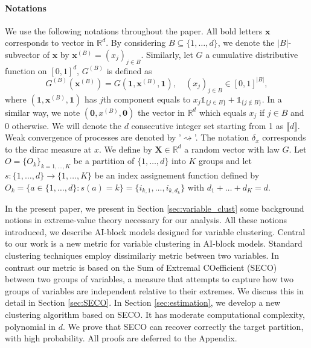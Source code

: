 \documentclass[11pt]{article}
\begin{document}
	\paragraph{Notations} We use the following notations throughout the paper. All bold letters $\textbf{x}$ corresponds to vector in $\mathbb{R}^d$. By considering $B \subseteq \{1,\dots,d\}$, we denote the $|B|$-subvector of $\textbf{x}$ by $\textbf{x}^{(B)} = (x_j)_{j \in B}$. Similarly, let $G$ a cumulative distributive function on $[0,1]^d$, $G^{(B)}$ is defined as
	\begin{equation*}
		G^{(B)}(\textbf{x}^{(B)}) = G(\textbf{1},\textbf{x}^{(B)}, \textbf{1}), \quad (x_j)_{j \in B} \in [0,1]^{|B|},
	\end{equation*}
	where $(\textbf{1},\textbf{x}^{(B)}, \textbf{1})$ has $j$th component equals to $x_j \mathds{1}_{\{j \in B\}} + \mathds{1}_{\{ j \notin B\}}$. In a similar way, we note $(\textbf{0}, x^{(B)}, \textbf{0})$ the vector in $\mathbb{R}^d$ which equals $x_j$ if $j \in B$ and $ 0 $ otherwise. We will denote the $d$ consecutive integer set starting from 1 as $\llbracket d \rrbracket$. Weak convergence of processes are denoted by '$\rightsquigarrow$'. The notation $\delta_x$ corresponds to the dirac measure at $x$. We define by $\textbf{X} \in \mathbb{R}^d$ a random vector with law $G$. Let $O = \{O_k\}_{k= 1 ,\dots, K}$ be a partition of $\{1,\dots,d\}$ into $K$ groups and let $s : \{1,\dots,d\} \rightarrow \{1,\dots,K\}$ be an index assignement function defined by $O_k = \{a \in \{1,\dots,d\} : s(a) = k\} = \{i_{k,1}, \dots, i_{k,d_k}\}$ with $d_1+\dots+d_K = d$.
	
	In the present paper, we present in Section \ref{sec:variable_clust} some background notions in extreme-value theory necessary for our analysis. All these notions introduced, we describe AI-block models designed for variable clustering. Central to our work is a new metric for variable clustering in AI-block models. Standard clustering techniques employ dissimilariy metric between two variables. In contrast our metric is based on the Sum of Extremal COefficient (SECO) between two groups of variables, a measure that attempts to capture how two groups of variables are independent relative to their extremes. We discuss this in detail in Section \ref{sec:SECO}. In Section \ref{sec:estimation}, we develop a new clustering algorithm based on SECO. It has moderate computational complexity, polynomial in $d$. We prove that SECO can recover correctly the target partition, with high probability. All proofs are deferred to the Appendix.
	
\end{document}
